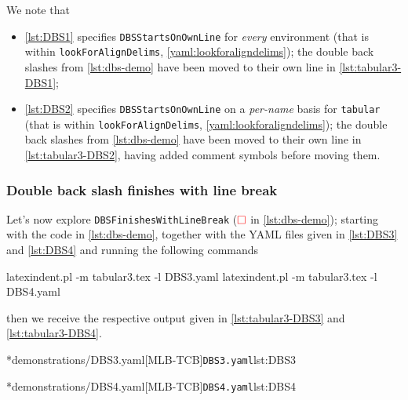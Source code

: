 	We note that
	\begin{itemize}
		\item \cref{lst:DBS1} specifies \texttt{DBSStartsOnOwnLine} for
		      \emph{every} environment (that is within \texttt{lookForAlignDelims},
		      \vref{yaml:lookforaligndelims});
		      the double back slashes from \cref{lst:dbs-demo} have been moved to their own
		      line in \cref{lst:tabular3-DBS1};
		\item \cref{lst:DBS2} specifies \texttt{DBSStartsOnOwnLine} on a
		      \emph{per-name} basis for \texttt{tabular} (that is within \texttt{lookForAlignDelims}, \vref{yaml:lookforaligndelims});
		      the double back slashes from \cref{lst:dbs-demo} have been moved to their own
		      line in \cref{lst:tabular3-DBS2}, having added comment symbols before moving them.
	\end{itemize}

\subsubsection{Double back slash finishes with line break}
	Let's now explore \texttt{DBSFinishesWithLineBreak} ($\color{red}\square$ in \cref{lst:dbs-demo}); starting with the code in
	\cref{lst:dbs-demo}, together with the YAML files given in
	\cref{lst:DBS3} and \cref{lst:DBS4} and running the following
	commands
	\begin{commandshell}
latexindent.pl -m tabular3.tex -l DBS3.yaml
latexindent.pl -m tabular3.tex -l DBS4.yaml
\end{commandshell}
	then we receive the respective output given in \cref{lst:tabular3-DBS3} and
	\cref{lst:tabular3-DBS4}.

	\begin{cmhtcbraster}[raster column skip=.01\linewidth]
		\cmhlistingsfromfile[style=yaml-LST]*{demonstrations/DBS3.yaml}[MLB-TCB]{\texttt{DBS3.yaml}}{lst:DBS3}
	\end{cmhtcbraster}

	\begin{cmhtcbraster}[raster column skip=.01\linewidth]
		\cmhlistingsfromfile[style=yaml-LST]*{demonstrations/DBS4.yaml}[MLB-TCB]{\texttt{DBS4.yaml}}{lst:DBS4}
	\end{cmhtcbraster}

